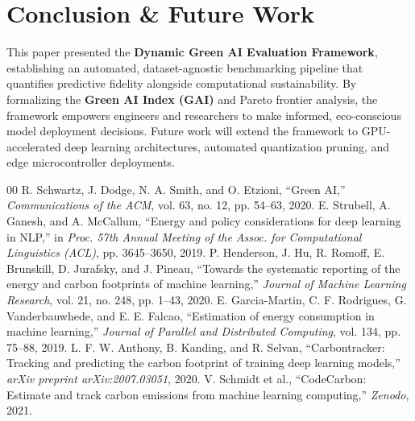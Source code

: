 \documentclass[conference]{IEEEtran}
\begin{document}
\section{Conclusion \& Future Work}
This paper presented the \textbf{Dynamic Green AI Evaluation Framework}, establishing an automated, dataset-agnostic benchmarking pipeline that quantifies predictive fidelity alongside computational sustainability. By formalizing the \textbf{Green AI Index (GAI)} and Pareto frontier analysis, the framework empowers engineers and researchers to make informed, eco-conscious model deployment decisions. Future work will extend the framework to GPU-accelerated deep learning architectures, automated quantization pruning, and edge microcontroller deployments.

\begin{thebibliography}{00}
 R. Schwartz, J. Dodge, N. A. Smith, and O. Etzioni, ``Green AI,'' \textit{Communications of the ACM}, vol. 63, no. 12, pp. 54--63, 2020.
 E. Strubell, A. Ganesh, and A. McCallum, ``Energy and policy considerations for deep learning in NLP,'' in \textit{Proc. 57th Annual Meeting of the Assoc. for Computational Linguistics (ACL)}, pp. 3645--3650, 2019.
 P. Henderson, J. Hu, R. Romoff, E. Brunskill, D. Jurafsky, and J. Pineau, ``Towards the systematic reporting of the energy and carbon footprints of machine learning,'' \textit{Journal of Machine Learning Research}, vol. 21, no. 248, pp. 1--43, 2020.
 E. Garcia-Martin, C. F. Rodrigues, G. Vanderbauwhede, and E. E. Falcao, ``Estimation of energy consumption in machine learning,'' \textit{Journal of Parallel and Distributed Computing}, vol. 134, pp. 75--88, 2019.
 L. F. W. Anthony, B. Kanding, and R. Selvan, ``Carbontracker: Tracking and predicting the carbon footprint of training deep learning models,'' \textit{arXiv preprint arXiv:2007.03051}, 2020.
 V. Schmidt et al., ``CodeCarbon: Estimate and track carbon emissions from machine learning computing,'' \textit{Zenodo}, 2021.
\end{thebibliography}
\end{document}
